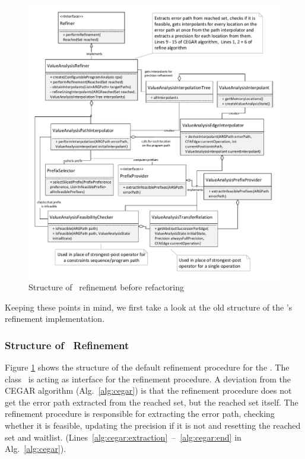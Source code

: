 \begin{figure}
\centering
\includegraphics[width=1.2\linewidth]{implementationCegar/ValueAnalysisRefinementBefore}
\caption{Structure of \ refinement before refactoring}
\label{fig:valRefinementBefore}
\end{figure}

Keeping these points  in mind, we first take a look at the old structure of the 's refinement implementation.

\subsubsection{Structure of \ValueAnalysisCPA\ Refinement}
Figure \ref{fig:valRefinementBefore} shows the structure of the default refinement procedure for the .
The class \ is acting as interface for the refinement procedure.
A deviation from the CEGAR algorithm (Alg.~\ref{alg:cegar}) is that the refinement procedure does not get the error path extracted from the reached set, but the reached set itself.
The refinement procedure is responsible for extracting the error path, checking whether it is feasible, updating the precision if it is not and resetting the reached set and waitlist. (Lines~\ref{alg:cegar:extraction}~--~\ref{alg:cegar:end} in Alg.~\ref{alg:cegar}).

